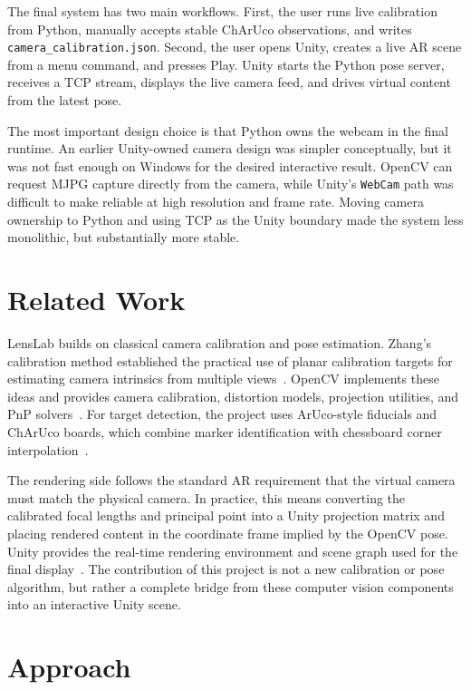 \documentclass[10pt,twocolumn,letterpaper]{article}
\begin{document}
The final system has two main workflows.  First, the user runs live calibration
from Python, manually accepts stable ChArUco observations, and writes
\texttt{camera\_calibration.json}.  Second, the user opens Unity, creates a live
AR scene from a menu command, and presses Play.  Unity starts the Python pose
server, receives a TCP stream, displays the live camera feed, and drives virtual
content from the latest pose.

The most important design choice is that Python owns the webcam in the final
runtime.  An earlier Unity-owned camera design was simpler conceptually, but it
was not fast enough on Windows for the desired interactive result.  OpenCV can
request MJPG capture directly from the camera, while Unity's \texttt{WebCam}
path was difficult to make reliable at high resolution and frame rate.  Moving
camera ownership to Python and using TCP as the Unity boundary made the system
less monolithic, but substantially more stable.

\section{Related Work}

LensLab builds on classical camera calibration and pose estimation.  Zhang's
calibration method established the practical use of planar calibration targets
for estimating camera intrinsics from multiple views~\cite{Zhang2000}.  OpenCV
implements these ideas and provides camera calibration, distortion models,
projection utilities, and PnP solvers~\cite{OpenCV}.  For target detection, the
project uses ArUco-style fiducials and ChArUco boards, which combine marker
identification with chessboard corner interpolation~\cite{GarridoJurado2014}.

The rendering side follows the standard AR requirement that the virtual camera
must match the physical camera.  In practice, this means converting the
calibrated focal lengths and principal point into a Unity projection matrix and
placing rendered content in the coordinate frame implied by the OpenCV pose.
Unity provides the real-time rendering environment and scene graph used for the
final display~\cite{Unity}.  The contribution of this project is not a new
calibration or pose algorithm, but rather a complete bridge from these computer
vision components into an interactive Unity scene.

\section{Approach}
\end{document}
